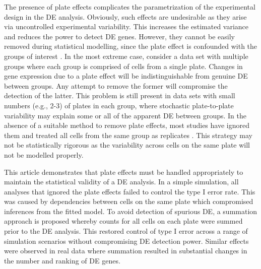 \documentclass[oupdraft]{bio}
\begin{document}
The presence of plate effects complicates the parametrization of the experimental design in the DE analysis.
Obviously, such effects are undesirable as they arise via uncontrolled experimental variability.
This increases the estimated variance and reduces the power to detect DE genes.
However, they cannot be easily removed during statistical modelling, since the plate effect is confounded with the groups of interest \citep{hicks2015widespread}.
In the most extreme case, consider a data set with multiple groups where each group is comprised of cells from a single plate.
Changes in gene expression due to a plate effect will be indistinguishable from genuine DE between groups.
Any attempt to remove the former will compromise the detection of the latter.
This problem is still present in data sets with small numbers (e.g., 2-3) of plates in each group, 
    where stochastic plate-to-plate variability may explain some or all of the apparent DE between groups.
In the absence of a suitable method to remove plate effects, most studies have ignored them and treated all cells from the same group as replicates \citep{kolod2015single,gaublomme2015single,kowalczyk2015single}.
This strategy may not be statistically rigorous as the variability across cells on the same plate will not be modelled properly.


This article demonstrates that plate effects must be handled appropriately to maintain the statistical validity of a DE analysis.
In a simple simulation, all analyses that ignored the plate effects failed to control the type I error rate.
This was caused by dependencies between cells on the same plate which compromised inferences from the fitted model.
To avoid detection of spurious DE, a summation approach is proposed whereby counts for all cells on each plate were summed prior to the DE analysis.
This restored control of type I error across a range of simulation scenarios without compromising DE detection power.
Similar effects were observed in real data where summation resulted in substantial changes in the number and ranking of DE genes.
\end{document}
